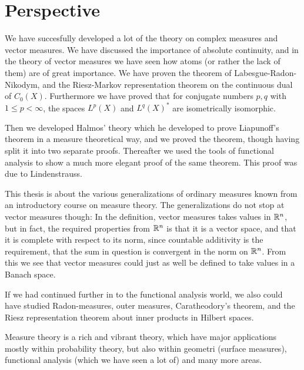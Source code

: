 \section{Perspective}

We have succesfully developed a lot of the theory on complex measures and vector measures. We have discussed the importance of absolute continuity, and in the theory of vector measures we have seen how atoms (or rather the lack of them) are of great importance. We have proven the theorem of Labesgue-Radon-Nikodym, and the Riesz-Markov representation theorem on the continuous dual of $C_{0}(X)$. Furthermore we have proved that for conjugate numbers $p,q$ with $1 \le p < \infty$, the spaces $L^{p}(X)$ and $L^{q}(X)^{*}$ are isometrically isomorphic.

Then we developed Halmos' theory which he developed to prove Liapunoff's theorem in a measure theoretical way, and we proved the theorem, though having split it into two separate proofs. Thereafter we used the tools of functional analysis to show a much more elegant proof of the same theorem. This proof was due to Lindenstrauss.

This thesis is about the various generalizations of ordinary measures known from an introductory course on measure theory. The generalizations do not stop at vector measures though:
In the definition, vector measures takes values in $\mathbb{R}^{n}$, but in fact, the required properties from $\mathbb{R}^{n}$ is that it is a vector space, and that it is complete with respect to its norm, since countable additivity is the requirement, that the sum in question is convergent in the norm on $\mathbb{R}^{n}$. From this we see that vector measures could just as well be defined to take values in a Banach space.

If we had continued further in to the functional analysis world, we also could have studied Radon-measures, outer measures, Caratheodory's theorem, and the Riesz representation theorem about inner products in Hilbert spaces.

Measure theory is a rich and vibrant theory, which have major applications mostly within probability theory, but also within geometri (surface measures), functional analysis (which we have seen a lot of) and many more areas.